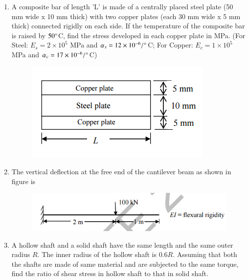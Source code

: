 \documentclass[a4paper,10pt]{article}
\begin{document}
\begin{enumerate}
    \item A composite bar of length 'L' is made of a centrally placed steel plate (50 mm wide x 10 mm thick) with two copper plates (each 30 mm wide x 5 mm thick) connected rigidly on each side. If the temperature of the composite bar is raised by $50 \degree$C, find the stress developed in each copper plate in MPa.
    (For Steel: $E_s = 2 \times 10^5$ MPa and $\alpha_s = 12 \times 10^{-6} / \degree$C; For Copper: $E_c = 1 \times 10^5$ MPa and $\alpha_c = 17 \times 10^{-6} / \degree$C)
    \begin{figure}[H] \centering \includegraphics[width=0.5\columnwidth]{q10_solid.png} \caption*{} \label{fig:q10_solid} \end{figure}
    
    \hfill{}

    \item The vertical deflection at the free end of the cantilever beam as shown in figure is
    \begin{figure}[H] \centering \includegraphics[width=0.5\columnwidth]{q11_solid.png} \caption*{} \label{fig:q11_solid} \end{figure}
    
    \hfill{}
    \begin{enumerate}
    \end{enumerate}
    
    \item A hollow shaft and a solid shaft have the same length and the same outer radius $R$. The inner radius of the hollow shaft is $0.6 R$. Assuming that both the shafts are made of same material and are subjected to the same torque, find the ratio of shear stress in hollow shaft to that in solid shaft.
    

\end{enumerate}
\end{document}
